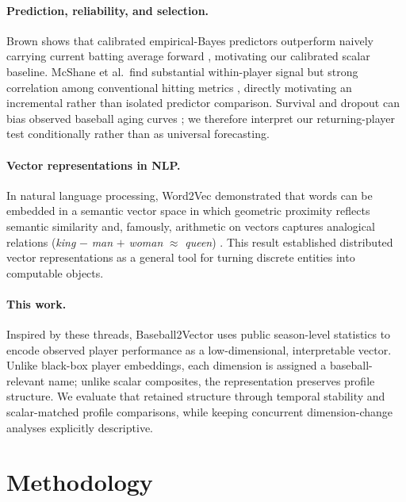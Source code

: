 \documentclass[10pt,twocolumn,letterpaper]{article}
\begin{document}
\paragraph{Prediction, reliability, and selection.}
Brown shows that calibrated empirical-Bayes predictors outperform naively carrying current batting average forward \cite{brown2008}, motivating our calibrated scalar baseline. McShane et al.\ find substantial within-player signal but strong correlation among conventional hitting metrics \cite{mcshane2011}, directly motivating an incremental rather than isolated predictor comparison. Survival and dropout can bias observed baseball aging curves \cite{nguyen2024}; we therefore interpret our returning-player test conditionally rather than as universal forecasting.
\paragraph{Vector representations in NLP.}
In natural language processing, Word2Vec demonstrated that words can be embedded in a semantic vector space in which geometric proximity reflects semantic similarity and, famously, arithmetic on vectors captures analogical relations (\emph{king} $-$ \emph{man} $+$ \emph{woman} $\approx$ \emph{queen}) \cite{mikolov2013}. This result established distributed vector representations as a general tool for turning discrete entities into computable objects.

\paragraph{This work.}
Inspired by these threads, Baseball2Vector uses public season-level statistics to encode observed player performance as a low-dimensional, interpretable vector. Unlike black-box player embeddings, each dimension is assigned a baseball-relevant name; unlike scalar composites, the representation preserves profile structure. We evaluate that retained structure through temporal stability and scalar-matched profile comparisons, while keeping concurrent dimension-change analyses explicitly descriptive.

\section{Methodology}
\label{sec:method}
\end{document}
